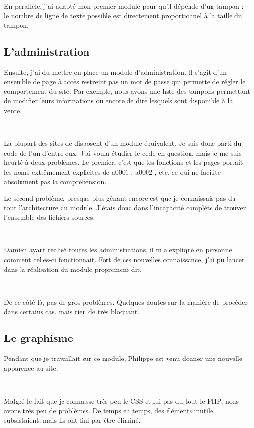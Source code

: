~

En parallèle, j'ai adapté mon premier module pour qu'il dépende d'un tampon : le nombre de ligne de texte possible est directement proportionnel à la taille du tampon.

\subsection{L'administration}
Ensuite, j'ai du mettre en place un module d'administration. Il s'agit d'un ensemble de page à accès restreint pas un mot de passe qui permette de régler le comportement du site. Par exemple, nous avons une liste des tampons permettant de modifier leurs informations ou encore de dire lesquels sont disponible à la vente.

~

La plupart des sites de \fidit{} disposent d'un module équivalent. Je suis donc parti du code de l'un d'entre eux. J'ai voulu étudier le code en question, mais je me suis heurté à deux problèmes. Le premier, c'est que les fonctions et les pages portait les noms extrêmement explicites de \og a0001 \fg, \og a0002 \fg, etc. ce qui ne facilite absolument pas la compréhension.

Le second problème, presque plus gênant encore est que je connaissais pas du tout l'architecture du module. J'étais donc dans l'incapacité complète de trouver l'ensemble des fichiers sources.

~

Damien ayant réalisé toutes les administrations, il m'a expliqué en personne comment celles-ci fonctionnait. Fort de ces nouvelles connaissance, j'ai pu lancer dans la réalisation du module proprement dit.

~

De ce côté là, pas de gros problèmes. Quelques doutes sur la manière de procéder dans certains cas, mais rien de très bloquant.

\subsection{Le graphisme}
Pendant que je travaillait sur ce module, Philippe est venu donner une nouvelle apparence au site.

~

Malgré le fait que je connaisse très peu le CSS et lui pas du tout le PHP, nous avons très peu de problèmes. De temps en temps, des éléments inutile subsistaient, mais ils ont fini par être éliminé.

